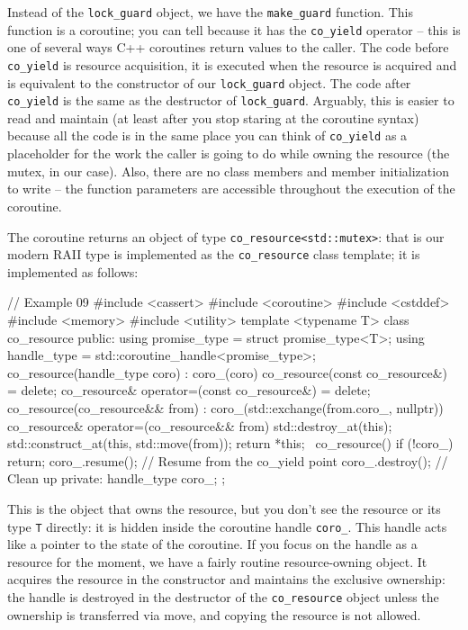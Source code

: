Instead of the \texttt{lock\_guard} object, we have the \texttt{make\_guard} function. This function is a coroutine; you can tell because it has the \texttt{co\_yield} operator -- this is one of several ways C++ coroutines return values to the caller. The code before \texttt{co\_yield} is resource acquisition, it is executed when the resource is acquired and is equivalent to the constructor of our \texttt{lock\_guard} object. The code after \texttt{co\_yield} is the same as the destructor of \texttt{lock\_guard}. Arguably, this is easier to read and maintain (at least after you stop staring at the coroutine syntax) because all the code is in the same place you can think of \texttt{co\_yield} as a placeholder for the work the caller is going to do while owning the resource (the mutex, in our case). Also, there are no class members and member initialization to write -- the function parameters are accessible throughout the execution of the coroutine.

The coroutine returns an object of type \texttt{co\_resource\textless{}std::mutex\textgreater{}}: that is our modern RAII type is implemented as the \texttt{co\_resource} class template; it is implemented as follows:

\begin{code}
// Example 09
#include <cassert>
#include <coroutine>
#include <cstddef>
#include <memory>
#include <utility>
template <typename T> class co_resource {
  public:
  using promise_type = struct promise_type<T>;
  using handle_type = std::coroutine_handle<promise_type>;
  co_resource(handle_type coro) : coro_(coro) {}
  co_resource(const co_resource&) = delete;
  co_resource& operator=(const co_resource&) = delete;
  co_resource(co_resource&& from)
     : coro_(std::exchange(from.coro_, nullptr)) {}
  co_resource& operator=(co_resource&& from) {
    std::destroy_at(this);
    std::construct_at(this, std::move(from));
    return *this;
  }
  ~co_resource() {
    if (!coro_) return;
    coro_.resume();     // Resume from the co_yield point
    coro_.destroy();    // Clean up
  }
  private:
  handle_type coro_;
};
\end{code}

This is the object that owns the resource, but you don't see the resource or its type \texttt{T} directly: it is hidden inside the coroutine handle \texttt{coro\_}. This handle acts like a pointer to the state of the coroutine. If you focus on the handle as a resource for the moment, we have a fairly routine resource-owning object. It acquires the resource in the constructor and maintains the exclusive ownership: the handle is destroyed in the destructor of the \texttt{co\_resource} object unless the ownership is transferred via move, and copying the resource is not allowed.

